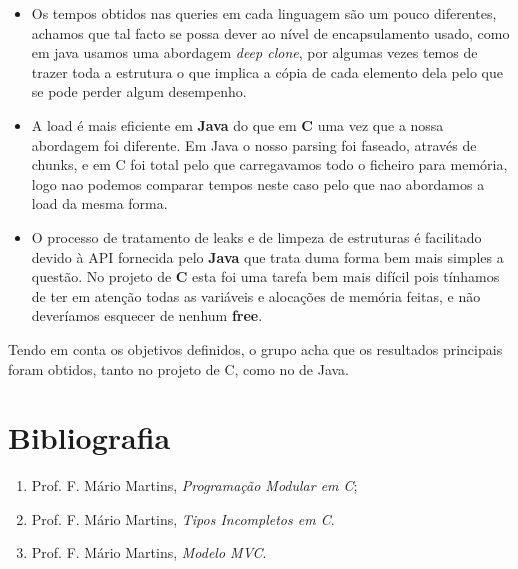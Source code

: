 \documentclass[a4paper]{article}
\begin{document}
\begin{itemize}
  \item Os tempos obtidos nas queries em cada linguagem são um pouco diferentes, achamos que 
  tal facto se possa dever ao nível de encapsulamento usado, como em java usamos uma 
  abordagem \textit{deep clone}, por algumas vezes temos de trazer toda a estrutura o 
  que implica a cópia de cada elemento dela pelo que se pode perder algum desempenho.

  \item A load é mais eficiente em \textbf{Java} do que em \textbf{C} uma vez que a nossa 
  abordagem foi diferente. Em Java o nosso parsing foi faseado, através de chunks, e em C 
  foi total pelo que carregavamos todo o ficheiro para memória, logo nao podemos comparar 
  tempos neste caso pelo que nao abordamos a load da mesma forma.

  \item O processo de tratamento de leaks e de limpeza de estruturas é facilitado devido 
  à API fornecida pelo \textbf{Java} que trata duma forma bem mais simples a questão. No 
  projeto de \textbf{C} esta foi uma tarefa bem mais difícil pois tínhamos de ter em atenção 
  todas as variáveis e alocações de memória feitas, e não deveríamos esquecer de nenhum 
  \textbf{free}.
\end{itemize}

Tendo em conta os objetivos definidos, o grupo acha que os resultados principais foram obtidos,
tanto no projeto de C, como no de Java.

\section{Bibliografia}

\begin{enumerate} 
	\item Prof. F. Mário Martins, \textit{Programação Modular em C};
	\item Prof. F. Mário Martins, \textit{Tipos Incompletos em C}.
  \item Prof. F. Mário Martins, \textit{Modelo MVC}.
\end{enumerate}
\end{document}
